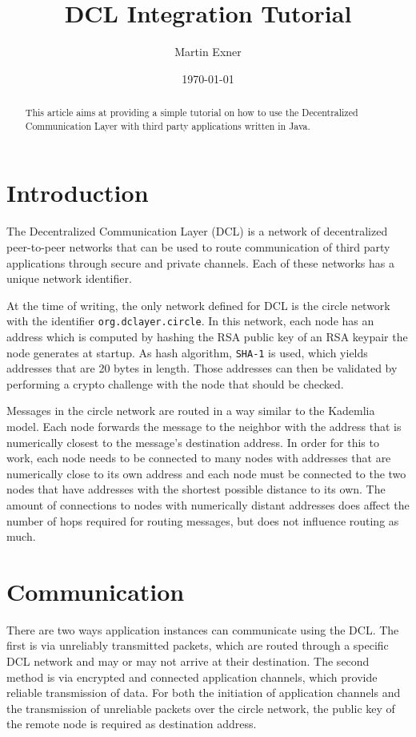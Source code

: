 \documentclass[a4paper,twoside,twocolumn,DIV=12,BCOR=1cm]{scrartcl}
\title{DCL Integration Tutorial}
\author{Martin Exner}
\date{\today}
\newcommand{\code}[1]{\texttt{#1}}
\begin{document}
\maketitle

\begin{abstract}
This article aims at providing a simple tutorial on how to use the
Decentralized Communication Layer with third party applications written
in Java.
\end{abstract}

\section*{Introduction}
The Decentralized Communication Layer (DCL) is a network of decentralized
peer-to-peer networks that can be used to route communication of third party
applications through secure and private channels. Each of these networks has a
unique network identifier.

At the time of writing, the only network defined for DCL is the circle network
with the identifier \code{org.dclayer.circle}. In this network, each node has
an address which is computed by hashing the RSA public key of an RSA keypair
the node generates at startup. As hash algorithm, \code{SHA-1} is used, which
yields addresses that are 20 bytes in length. Those addresses can then be
validated by performing a crypto challenge with the node that should be checked.

Messages in the circle network are routed in a way similar to the Kademlia
model. Each node forwards the message to the neighbor with the address that is
numerically closest to the message's destination address. In order for this to
work, each node needs to be connected to many nodes with addresses that are
numerically close to its own address and each node must be connected to the two
nodes that have addresses with the shortest possible distance to its own. The
amount of connections to nodes with numerically distant addresses does affect
the number of hops required for routing messages, but does not influence routing
as much.

\section*{Communication}
There are two ways application instances can communicate using the DCL.
The first is via unreliably transmitted packets, which are routed through a
specific DCL network and may or may not arrive at their destination.
The second method is via encrypted and connected application channels, which
provide reliable transmission of data. For both the initiation of application
channels and the transmission of unreliable packets over the circle network, the
public key of the remote node is required as destination address.
\end{document}
